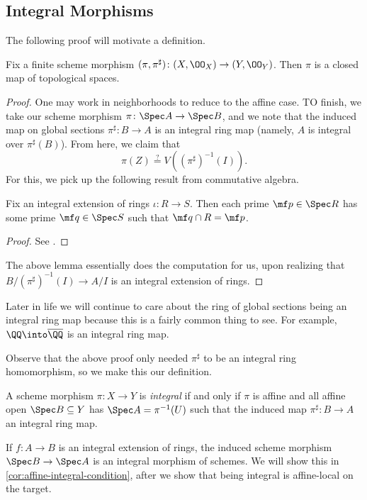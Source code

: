 \documentclass[../notes.tex]{subfiles}
\begin{document}
\subsection{Integral Morphisms}
The following proof will motivate a definition.
\begin{lemma}
	Fix a finite scheme morphism $(\pi,\pi^\sharp)\colon (X,\OO_X)\to (Y,\OO_Y)$. Then $\pi$ is a closed map of topological spaces.
\end{lemma}
\begin{proof}
	One may work in neighborhoods to reduce to the affine case. TO finish, we take our scheme morphism $\pi\colon\Spec A\to\Spec B$, and we note that the induced map on global sections $\pi^\sharp\colon B\to A$ is an integral ring map (namely, $A$ is integral over $\pi^\sharp(B)$). From here, we claim that
	\[\pi(Z)\stackrel?=V\left((\pi^\sharp)^{-1}(I)\right).\]
	For this, we pick up the following result from commutative algebra.
	\begin{lemma}
		Fix an integral extension of rings $\iota\colon R\to S$. Then each prime $\mf p\in\Spec R$ has some prime $\mf q\in\Spec S$ such that $\mf q\cap R=\mf p$.
	\end{lemma}
	\begin{proof}
		See \cite[\S4.4]{eisenbud-comm-alg}.
	\end{proof}
	The above lemma essentially does the computation for us, upon realizing that $B/(\pi^\sharp)^{-1}(I)\to A/I$ is an integral extension of rings.
\end{proof}
\begin{remark}
	Later in life we will continue to care about the ring of global sections being an integral ring map because this is a fairly common thing to see. For example, $\QQ\into\overline\QQ$ is an integral ring map.
\end{remark}
Observe that the above proof only needed $\pi^\sharp$ to be an integral ring homomorphism, so we make this our definition.
\begin{definition}
	A scheme morphism $\pi\colon X\to Y$ is \textit{integral} if and only if $\pi$ is affine and all affine open $\Spec B\subseteq Y$ has $\Spec A=\pi^{-1}(U)$ such that the induced map $\pi^\sharp\colon B\to A$ an integral ring map.
\end{definition}
\begin{example}
	If $f\colon A\to B$ is an integral extension of rings, the induced scheme morphism $\Spec B\to\Spec A$ is an integral morphism of schemes. We will show this in \autoref{cor:affine-integral-condition}, after we show that being integral is affine-local on the target.
\end{example}
\end{document}
